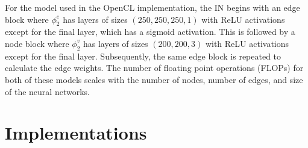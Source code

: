 \documentclass{article}
\begin{document}
For the model used in the OpenCL implementation, the IN begins with an edge block where $\phi_2^e$ has layers of sizes $(250, 250, 250, 1)$ with ReLU activations except for the final layer, which has a sigmoid activation.
This is followed by a node block where $\phi_2^v$ has layers of sizes $(200, 200, 3)$ with ReLU activations except for the final layer.
Subsequently, the same edge block is repeated to calculate the edge weights.
The number of floating point operations (FLOPs) for both of these models scales with the number of nodes, number of edges, and size of the neural networks. 

\section{Implementations}
\label{sec:impl}
\end{document}
